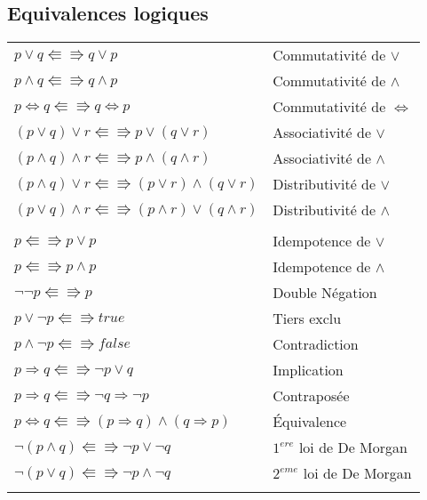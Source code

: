 \subsection{Equivalences logiques}
			\begin{center}
			\begin{tabular}{ll}
			$p \lor q \Lleftarrow \Rrightarrow q \lor p$ & Commutativité de $\lor$\\
			$p \land q \Lleftarrow \Rrightarrow q \land p$ & Commutativité de $\land$\\
			$p \Leftrightarrow q \Lleftarrow \Rrightarrow q \Leftrightarrow p$ & Commutativité de $\Leftrightarrow$\\

			$(p \lor q) \lor r \Lleftarrow \Rrightarrow p \lor (q \lor r)$ & Associativité de $\lor$\\
			$(p \land q) \land r \Lleftarrow \Rrightarrow p \land (q \land r)$ & Associativité de $\land$\\

			$(p \land q) \lor r \Lleftarrow \Rrightarrow (p \lor r) \land (q \lor r)$ & Distributivité de $\lor$\\
			$(p \lor q) \land r \Lleftarrow \Rrightarrow (p \land r) \lor (q \land r)$ & Distributivité de $\land$\\
			\\

			$p \Lleftarrow \Rrightarrow p \lor p$ & Idempotence de $\lor$\\
			$p \Lleftarrow \Rrightarrow p \land p$ & Idempotence de $\land$\\

			$ \lnot \lnot p \Lleftarrow \Rrightarrow p$ & Double Négation\\
			$p \lor \lnot p \Lleftarrow \Rrightarrow true$ & Tiers exclu\\
			$p \land \lnot p \Lleftarrow \Rrightarrow false$ & Contradiction\\
			$p \Rightarrow q \Lleftarrow \Rrightarrow \lnot p \lor q$ & Implication\\
			$p \Rightarrow q \Lleftarrow \Rrightarrow \lnot q \Rightarrow \lnot p$ & Contraposée\\
			$p \Leftrightarrow q \Lleftarrow \Rrightarrow (p \Rightarrow q) \land (q \Rightarrow p)$ & Équivalence\\

			$\lnot (p \land q) \Lleftarrow \Rrightarrow \lnot p \lor \lnot q$ & $1^{ere}$ loi de De Morgan\\
			$\lnot (p \lor q) \Lleftarrow \Rrightarrow \lnot p \land \lnot q$ & $2^{eme}$ loi de De Morgan\\
			\\


\end{tabular}
\end{center}

